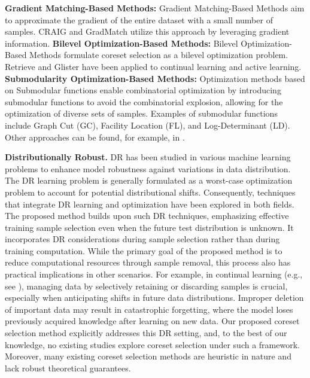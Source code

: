 %
\textbf{Gradient Matching-Based Methods:}
%
Gradient Matching-Based Methods aim to approximate the gradient of the entire dataset with a small number of samples.
%
CRAIG\citep{mirzasoleiman2020coresets} and GradMatch\citep{killamsetty2021grad} utilize this approach by leveraging gradient information.
%
\textbf{Bilevel Optimization-Based Methods:}
%
Bilevel Optimization-Based Methods formulate coreset selection as a bilevel optimization problem.
%
Retrieve\citep{killamsetty2021retrieve} and Glister\citep{killamsetty2021glister} have been applied to continual learning and active learning.
%
\textbf{Submodularity Optimization-Based Methods:}
%
Optimization methods based on Submodular functions\citep{iyer2013submodular} enable combinatorial optimization by introducing submodular functions to avoid the combinatorial explosion, allowing for the optimization of diverse sets of samples.
%
Examples of submodular functions include Graph Cut (GC), Facility Location (FL), and Log-Determinant (LD)\citep{iyer2021submodular}.
%
Other approaches can be found, for example, in \citet{guo2022deepcore}.

\textbf{Distributionally Robust.}
DR has been studied in various machine learning problems to enhance model robustness against variations in data distribution.
%
The DR learning problem is generally formulated as a worst-case optimization problem to account for potential distributional shifts.
%
Consequently, techniques that integrate DR learning and optimization have been explored in both fields.
%
The proposed method builds upon such DR techniques, emphasizing effective training sample selection even when the future test distribution is unknown. It incorporates DR considerations during sample selection rather than during training computation.
%
While the primary goal of the proposed method is to reduce computational resources through sample removal, this process also has practical implications in other scenarios.
%
For example, in continual learning (e.g., see \citet{wang2022memory}), managing data by selectively retaining or discarding samples is crucial, especially when anticipating shifts in future data distributions.
%
Improper deletion of important data may result in catastrophic forgetting\citep{kirkpatrick2017overcoming}, where the model loses previously acquired knowledge after learning on new data.
%
Our proposed coreset selection method explicitly addresses this DR setting, and, to the best of our knowledge, no existing studies explore coreset selection under such a framework.
%
Moreover, many existing coreset selection methods are heuristic in nature and lack robust theoretical guarantees.

